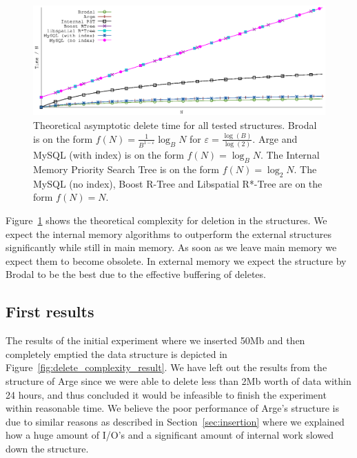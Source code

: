 \documentclass[twoside,11pt,openright]{report}
\def \epsilon {\varepsilon}
\begin{document}
\begin{figure}[htp!]
\centering
\includegraphics[width=1\textwidth]{../plots/delete_complexities/delete_complexity}
\caption{Theoretical asymptotic delete time for all tested structures. Brodal is on the form $f(N) = \frac{1}{B^{1-\epsilon}} \log_B N$ for $\epsilon = \frac{\log(B)}{\log(2)}$. Arge and MySQL (with index) is on the form $f(N) = \log_B N$. The Internal Memory Priority Search Tree is on the form $f(N) = \log_2 N$. The MySQL (no index), Boost R-Tree and Libspatial R*-Tree are on the form $f(N) = N$.}
\label{fig:theory_delete_complexity}
\end{figure}

Figure~\ref{fig:theory_delete_complexity} shows the theoretical complexity for deletion in the structures. We expect the internal memory algorithms to outperform the external structures significantly while still in main memory. As soon as we leave main memory we expect them to become obsolete. In external memory we expect the structure by Brodal to be the best due to the effective buffering of deletes.

\subsection*{First results}

The results of the initial experiment where we inserted 50Mb and then completely emptied the data structure is depicted in Figure~\ref{fig:delete_complexity_result}. We have left out the results from the structure of Arge since we were able to delete less than 2Mb worth of data within 24 hours, and thus concluded it would be infeasible to finish the experiment within reasonable time. We believe the poor performance of Arge's structure is due to similar reasons as described in Section~\ref{sec:insertion} where we explained how a huge amount of I/O's and a significant amount of internal work slowed down the structure.
\end{document}
